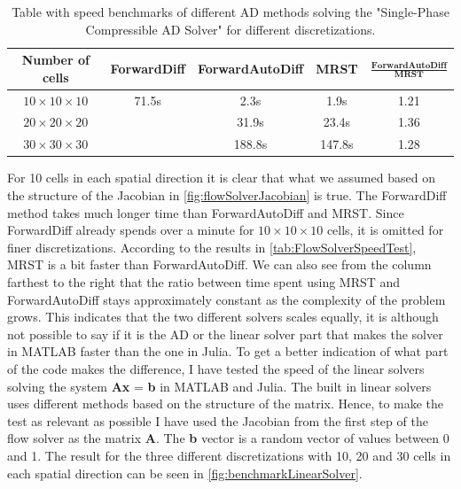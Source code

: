 \begin{table}[htb]
    \centering
    \caption{Table with speed benchmarks of different AD methods solving the "Single-Phase Compressible AD Solver" for different discretizations.}
    \label{tab:FlowSolverSpeedTest}
    \def\arraystretch{1.5}
    \begin{tabular}{ccccc}
    \textbf{Number of cells} & \textbf{ForwardDiff} & \textbf{ForwardAutoDiff} & \textbf{MRST} & $\frac{\textbf{ForwardAutoDiff}}{\textbf{MRST}}$\\
        \hline
         $10\times10\times10$ & 71.5s & 2.3s & 1.9s & 1.21 \\  
         $20\times20\times20$ & ~ & 31.9s & 23.4s & 1.36\\ 
         $30\times30\times30$ & ~ & 188.8s & 147.8s & 1.28\\ \hline
    \end{tabular}
\end{table}
For 10 cells in each spatial direction it is clear that what we assumed based on the structure of the Jacobian in \autoref{fig:flowSolverJacobian} is true. The ForwardDiff method takes much longer time than ForwardAutoDiff and MRST. Since ForwardDiff already spends over a minute for $10\times 10\times 10$ cells, it is omitted for finer discretizations. According to the results in \autoref{tab:FlowSolverSpeedTest}, MRST is a bit faster than ForwardAutoDiff. We can also see from the column farthest to the right that the ratio between time spent using MRST and ForwardAutoDiff stays approximately constant as the complexity of the problem grows. This indicates that the two different solvers scales equally, it is although not possible to say if it is the AD or the linear solver part that makes the solver in MATLAB faster than the one in Julia. To get a better indication of what part of the code makes the difference, I have tested the speed of the linear solvers solving the system \textbf{Ax} = \textbf{b} in MATLAB and Julia. The built in linear solvers uses different methods based on the structure of the matrix. Hence, to make the test as relevant as possible I have used the Jacobian from the first step of the flow solver as the matrix \textbf{A}. The \textbf{b} vector is a random vector of values between 0 and 1. The result for the three different discretizations with 10, 20 and 30 cells in each spatial direction can be seen in \autoref{fig:benchmarkLinearSolver}. 
